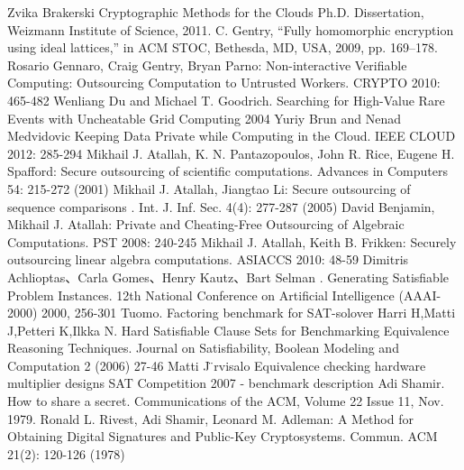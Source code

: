 \documentclass[runningheads,a4paper]{llncs}
\begin{document}
\newline[14]	Zvika Brakerski Cryptographic Methods for the Clouds Ph.D. Dissertation, Weizmann Institute of Science, 2011.
\newline[15]	C. Gentry, “Fully homomorphic encryption using ideal lattices,” in ACM STOC, Bethesda, MD, USA, 2009, pp. 169–178.
\newline[16]	Rosario Gennaro, Craig Gentry, Bryan Parno: Non-interactive Verifiable Computing: Outsourcing Computation to Untrusted Workers. CRYPTO 2010: 465-482
\newline[17]	Wenliang Du and Michael T. Goodrich. Searching for High-Value Rare Events with Uncheatable Grid Computing  2004
\newline[18]	Yuriy Brun and Nenad Medvidovic Keeping Data Private while Computing in the Cloud. IEEE CLOUD 2012: 285-294
\newline[19]	Mikhail J. Atallah, K. N. Pantazopoulos, John R. Rice, Eugene H. Spafford: Secure outsourcing of scientific computations. Advances in Computers 54: 215-272 (2001)
\newline[20]	Mikhail J. Atallah, Jiangtao Li: Secure outsourcing of sequence comparisons . Int. J. Inf. Sec. 4(4): 277-287 (2005)
\newline[21]	David Benjamin, Mikhail J. Atallah: Private and Cheating-Free Outsourcing of Algebraic Computations. PST 2008: 240-245
\newline[22]	Mikhail J. Atallah, Keith B. Frikken: Securely outsourcing linear algebra computations. ASIACCS 2010: 48-59
\newline[23]	Dimitris Achlioptas、Carla Gomes、Henry Kautz、Bart Selman . Generating Satisfiable Problem Instances. 12th National Conference on Artificial Intelligence (AAAI-2000) 2000, 256-301
\newline[24]	Tuomo. Factoring benchmark for SAT-solover
\newline[25]	Harri H,Matti J,Petteri K,Ilkka N. Hard Satisfiable Clause Sets for Benchmarking Equivalence Reasoning Techniques. Journal on Satisfiability, Boolean Modeling and Computation 2 (2006) 27-46
\newline[26]	Matti J ̈rvisalo  Equivalence checking hardware multiplier designs SAT Competition 2007 - benchmark description
\newline[27]	Adi Shamir. How to share a secret. Communications of the ACM, Volume 22 Issue 11, Nov. 1979.
\newline[28]	Ronald L. Rivest, Adi Shamir, Leonard M. Adleman: A Method for Obtaining Digital Signatures and Public-Key Cryptosystems. Commun. ACM 21(2): 120-126 (1978)
\end{document}
